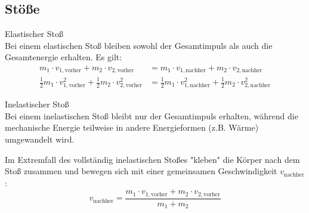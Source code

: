 \subsection{Stöße}
\begin{definition}{Elastischer Stoß}\\
    Bei einem elastischen Stoß bleiben sowohl der Gesamtimpuls als auch die Gesamtenergie erhalten. Es gilt:
    \begin{align}
        m_1 \cdot v_{1,\text{vorher}} + m_2 \cdot v_{2,\text{vorher}} &= m_1 \cdot v_{1,\text{nachher}} + m_2 \cdot v_{2,\text{nachher}} \\
        \frac{1}{2}m_1 \cdot v_{1,\text{vorher}}^2 + \frac{1}{2}m_2 \cdot v_{2,\text{vorher}}^2 &= \frac{1}{2}m_1 \cdot v_{1,\text{nachher}}^2 + \frac{1}{2}m_2 \cdot v_{2,\text{nachher}}^2
    \end{align}
\end{definition}

\begin{definition}{Inelastischer Stoß}\\
    Bei einem inelastischen Stoß bleibt nur der Gesamtimpuls erhalten, während die mechanische Energie teilweise in andere Energieformen (z.B. Wärme) umgewandelt wird.
    
    Im Extremfall des vollständig inelastischen Stoßes "kleben" die Körper nach dem Stoß zusammen und bewegen sich mit einer gemeinsamen Geschwindigkeit $v_{\text{nachher}}$:
    \begin{equation}
        v_{\text{nachher}} = \frac{m_1 \cdot v_{1,\text{vorher}} + m_2 \cdot v_{2,\text{vorher}}}{m_1 + m_2}
    \end{equation}
\end{definition}

